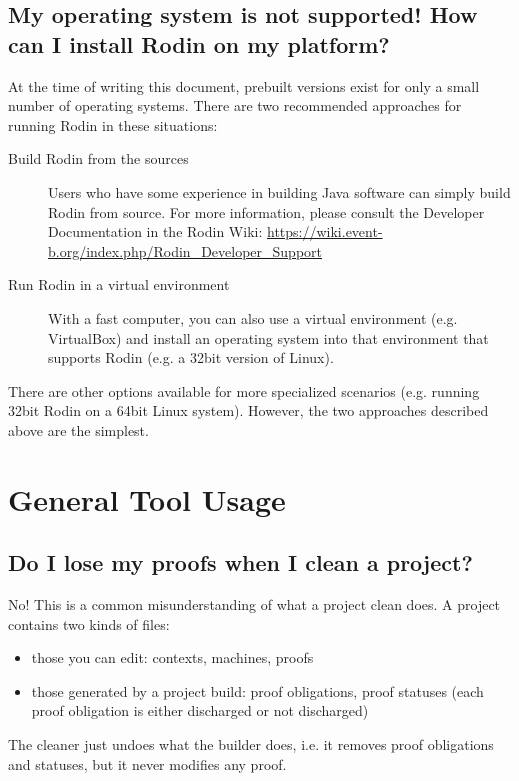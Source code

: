\subsection{My operating system is not supported!  How can I install Rodin on my platform?}
\label{faq_os_not_supported}
At the time of writing this document, prebuilt versions exist for only a small number of operating systems.  There are two recommended approaches for running Rodin in these situations:
\begin{description}
	\item[Build Rodin from the sources] Users who have some experience in building Java software can simply build Rodin from source.  For more information, please consult the Developer Documentation in the Rodin Wiki: \url{https://wiki.event-b.org/index.php/Rodin_Developer_Support}
	\item[Run Rodin in a virtual environment] With a fast computer, you can also use a virtual environment (e.g. VirtualBox) and install an operating system into that environment that supports Rodin (e.g. a 32bit version of Linux).
\end{description}

There are other options available for more specialized scenarios (e.g. running 32bit Rodin on a 64bit Linux system).  However, the two approaches described above are the simplest.

\section{General Tool Usage}

\subsection{Do I lose my proofs when I clean a project?}
No! This is a common misunderstanding of what a project clean does. A project contains two kinds of files: 

\begin{itemize}
	\item those you can edit: contexts, machines, proofs 
	\item those generated by a project build: proof obligations, proof statuses (each proof obligation is either discharged or not discharged) 
\end{itemize}

The cleaner just undoes what the builder does, i.e. it removes proof obligations and statuses, but it never modifies any proof.

